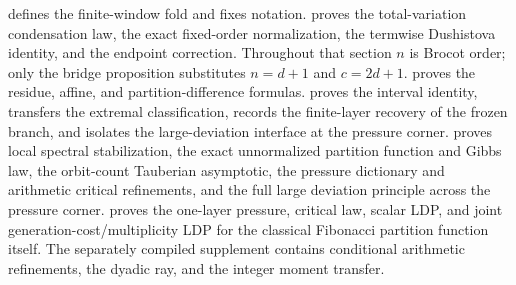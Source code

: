  defines the finite-window fold and fixes notation.
 proves the total-variation condensation law,
the exact fixed-order normalization, the termwise Dushistova identity, and
the endpoint correction.  Throughout that section \(n\) is Brocot order;
only the bridge proposition substitutes \(n=d+1\) and \(c=2d+1\).
 proves the residue, affine, and partition-difference
formulas.   proves the interval identity, transfers the
extremal classification, records the finite-layer recovery of the frozen
branch, and isolates the large-deviation interface at the pressure corner.
 proves local spectral stabilization, the exact
unnormalized partition function and Gibbs law, the orbit-count Tauberian
asymptotic, the pressure dictionary and arithmetic critical refinements, and
the full large deviation principle across the pressure corner.
 proves the one-layer pressure, critical
law, scalar LDP, and joint generation-cost/multiplicity LDP for the classical
Fibonacci partition function itself.
The separately compiled supplement
contains conditional arithmetic refinements, the dyadic ray, and the integer
moment transfer.
